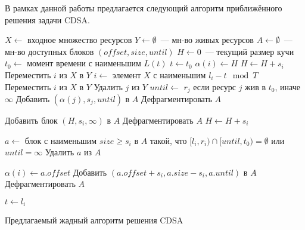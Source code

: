 В рамках данной работы предлагается следующий алгоритм приближённого решения задачи CDSA.
\begin{algorithm}
\begin{algorithmic}
\State $X \gets$ входное множество ресурсов
\State $Y \gets \emptyset$~--- мн-во живых ресурсов
\State $A \gets \emptyset$~--- мн-во доступных блоков $(offset, size, until)$
\State $H \gets 0$~--- текущий размер кучи
\State $t_0 \gets$ момент времени с наименьшим $L(t)$
\State $t \gets t_0$
    \State $\alpha(i) \gets H$
    \State $H \gets H + s_i$
    \State Переместить $i$ из $X$ в $Y$
\EndFor
\Repeat
    \State $i \gets$ элемент $X$ с наименьшим $l_i - t \mod T$
    \State Переместить $i$ из $X$ в $Y$
            \State Удалить $j$ из $Y$
            \State $until \gets$ $r_j$ если ресурс $j$ жив в $t_0$, иначе $\infty$
            \State Добавить $(\alpha(j), s_j, until)$ в $A$
            \State Дефрагментировать $A$
        \EndIf
    \EndFor

        \State Добавить блок $(H, s_i, \infty)$ в $A$
        \State Дефрагментировать $A$
        \State $H \gets H + s_i$
    \EndIf

    \State $a \gets$ блок с наименьшим $size \geqslant s_i$ в $A$ такой, что $[l_i, r_i) \cap [until, t_0) = \emptyset$ или $until = \infty$
    \State Удалить $a$ из $A$

    \State $\alpha(i) \gets a.offset$
        \State Добавить $(a.offset + s_i, a.size - s_i, a.until)$ в $A$
        \State Дефрагментировать $A$
    \EndIf

    \State $t \gets l_i$
\end{algorithmic}
\caption{Предлагаемый жадный алгоритм решения CDSA}
\label{fig:ouralgo}
\end{algorithm}

